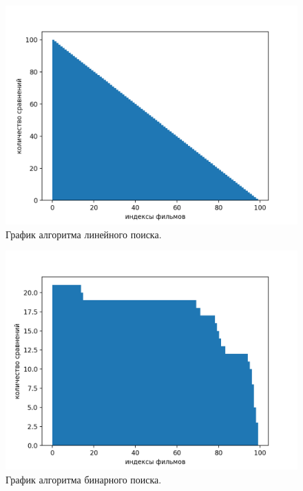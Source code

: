 \documentclass[12pt]{report}
\begin{document}
	\begin{figure}[H]
		\centering
		\includegraphics[scale=0.7]{lin_sorted.png}
		\caption{График алгоритма линейного поиска.}
		\label{fig:lin_sc_sorted}
	\end{figure}
	
		\begin{figure}[H]
		\centering
		\includegraphics[scale=0.7]{bin_sorted.png}
		\caption{График алгоритма бинарного поиска.}
		\label{fig:bin_sc_sorted}
	\end{figure}
	
\end{document}
